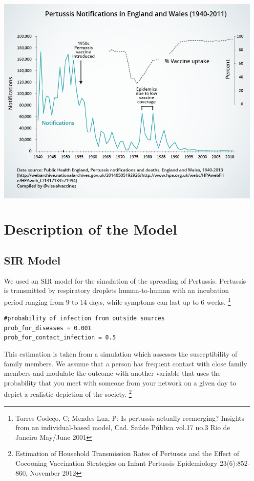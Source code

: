\documentclass[11pt]{article}
\begin{document}
\begin{center}
\includegraphics[scale=0.4]{ukpertussis}
\end{center}


\section{Description of the Model}

\subsection{SIR Model}

We used an SIR model for the simulation of the spreading of Pertussis. Pertussis is transmitted by respiratory droplets human-to-human with an incubation period ranging from 9 to 14 days, while symptoms can last up to 6 weeks. \footnote{Torres Codeço, C; Mendes Luz, P; Is pertussis actually reemerging? Insights from an individual-based model, Cad. Saúde Pública vol.17 no.3 Rio de Janeiro May/June 2001}

\begin{lstlisting}
#probability of infection from outside sources
prob_for_diseases = 0.001 
prob_for_contact_infection = 0.5
\end{lstlisting}

This estimation is taken from a simulation which assesses the susceptibility of family members. We assume that a person has frequent contact with close family members and modulate the outcome with another variable that uses the probability that you meet with someone from your network on a given day to depict a realistic depiction of the society. 
\footnote{Estimation of Household Transmission Rates of Pertussis and the Effect of Cocooning Vaccination Strategies on Infant Pertussis Epidemiology 23(6):852-860, November 2012}
\vspace{14px}
\end{document}
